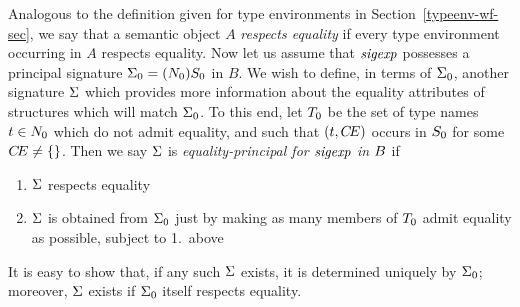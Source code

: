 {Analogous to the definition given for type environments in
Section~\ref{typeenv-wf-sec}, we say that a semantic object $A$
{\sl respects equality} if every type environment occurring in 
$A$ respects equality. 
%
%
%
\oldpagebreak
Now let us assume that $\sigexp$ possesses a principal signature
$\sig_0=\longsig{0}$ in $B$. We wish to
define, in terms of $\sig_0$, another signature $\sig$ which provides more
information about the equality attributes of structures which will
match $\sig_0$. To this end, let $\T_0$ be the set of type names $\t\in\N_0$
which do not admit equality, and such that $(\t,\CE)$ occurs in $\S_0$
for some $\CE\neq\emptymap$.  Then we say $\sig$ is 
{\sl equality-principal for $\sigexp$ in $\B$} if
\begin{enumerate}
\item
$\sig$ respects equality
\item
$\sig$ is obtained from $\sig_0$ just by making as many
members of $\T_0$ admit equality as possible, subject to 1.~above
\end{enumerate}
It is easy to show that, if any such $\sig$ exists, it is determined
uniquely by $\sig_0$; moreover, $\sig$ exists if $\sig_0$ itself
respects equality.
\bigskip}

%

%

%

%


